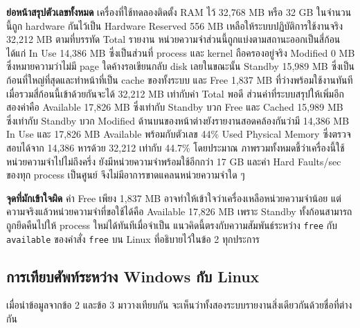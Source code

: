 \documentclass[a4paper,11pt]{article}
\newcommand{\code}[1]{\texttt{#1}}
\begin{document}
\textbf{ย่อหน้าสรุปตัวเลขทั้งหมด} เครื่องที่ใช้ทดลองติดตั้ง RAM ไว้ 32{,}768 MB หรือ 32 GB ในจำนวนนี้ถูก hardware กันไว้เป็น Hardware Reserved 556 MB เหลือให้ระบบปฏิบัติการใช้งานจริง 32{,}212 MB ตามที่บรรทัด Total รายงาน หน่วยความจำส่วนนี้ถูกแบ่งตามสถานะออกเป็นสี่ก้อน ได้แก่ In Use 14{,}386 MB ซึ่งเป็นส่วนที่ process และ kernel ถือครองอยู่จริง Modified 0 MB ซึ่งหมายความว่าไม่มี page ใดค้างรอเขียนกลับ disk เลยในขณะนั้น Standby 15{,}989 MB ซึ่งเป็นก้อนที่ใหญ่ที่สุดและทำหน้าที่เป็น cache ของทั้งระบบ และ Free 1{,}837 MB ที่ว่างพร้อมใช้งานทันที เมื่อรวมสี่ก้อนนี้เข้าด้วยกันจะได้ 32{,}212 MB เท่ากับค่า Total พอดี ส่วนค่าที่ระบบสรุปให้เพิ่มอีกสองค่าคือ Available 17{,}826 MB ซึ่งเท่ากับ Standby บวก Free และ Cached 15{,}989 MB ซึ่งเท่ากับ Standby บวก Modified ด้านบนของหน้าต่างยังรายงานสอดคล้องกันว่ามี 14{,}386 MB In Use และ 17{,}826 MB Available พร้อมกับตัวเลข 44\% Used Physical Memory ซึ่งตรวจสอบได้จาก 14{,}386 หารด้วย 32{,}212 เท่ากับ 44.7\% โดยประมาณ ภาพรวมทั้งหมดชี้ว่าเครื่องนี้ใช้หน่วยความจำไปไม่ถึงครึ่ง ยังมีหน่วยความจำพร้อมใช้อีกกว่า 17 GB และค่า Hard Faults/sec ของทุก process เป็นศูนย์ จึงไม่มีอาการขาดแคลนหน่วยความจำใด ๆ

\textbf{จุดที่มักเข้าใจผิด} ค่า Free เพียง 1{,}837 MB อาจทำให้เข้าใจว่าเครื่องเหลือหน่วยความจำน้อย แต่ความจริงแล้วหน่วยความจำที่ขอใช้ได้คือ Available 17{,}826 MB เพราะ Standby ทั้งก้อนสามารถถูกยึดคืนไปให้ process ใหม่ได้ทันทีเมื่อจำเป็น แนวคิดนี้ตรงกับความสัมพันธ์ระหว่าง \code{free} กับ \code{available} ของคำสั่ง \code{free} บน Linux ที่อธิบายไว้ในข้อ 2 ทุกประการ

\subsection{การเทียบศัพท์ระหว่าง Windows กับ Linux}

เมื่อนำข้อมูลจากข้อ 2 และข้อ 3 มาวางเทียบกัน จะเห็นว่าทั้งสองระบบรายงานสิ่งเดียวกันด้วยชื่อที่ต่างกัน
\end{document}

